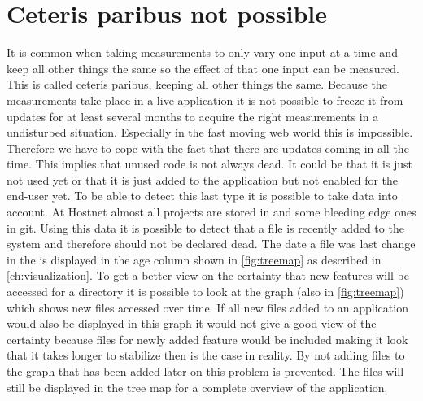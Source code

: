 \section{Ceteris paribus not possible}

It is common when taking measurements to only vary one input at a time and keep all other things the same so the effect of that one input can be measured. This is called ceteris paribus, keeping all other things the same. Because the measurements take place in a live application it is not possible to freeze it from updates for at least several months to acquire the right measurements in a undisturbed situation. Especially in the fast moving web world this is impossible. Therefore we have to cope with the fact that there are updates coming in all the time. This implies that unused code is not always dead. It could be that it is just not used yet or that it is just added to the application but not enabled for the end-user yet. To be able to detect this last type it is possible to take \vcs data into account. At Hostnet almost all projects are stored in \svn and some bleeding edge ones in git. Using this data it is possible to detect that a file is recently added to the system and therefore should not be declared dead. The date a file was last change in the \vcs is displayed in the age column shown in \autoref{fig:treemap} as described in \autoref{ch:visualization}. To get a better view on the certainty that new features will be accessed for a directory it is possible to look at the graph (also in \autoref{fig:treemap}) which shows new files accessed over time. If all new files added to an application would also be displayed in this graph it would not give a good view of the certainty because files for newly added feature would be included making it look that it takes longer to stabilize then is the case in reality. By not adding files to the graph that has been added later on this problem is prevented. The files will still be displayed in the tree map for a complete overview of the application.